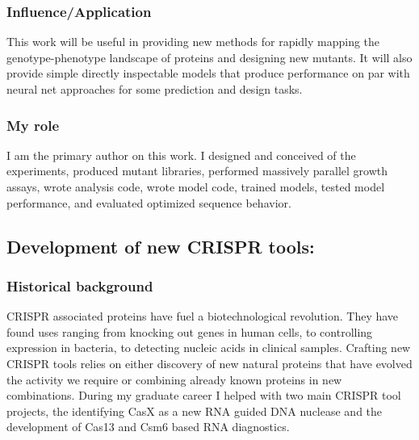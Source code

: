 \documentclass{article}
\begin{document}
\subsubsection{Influence/Application}
This work will be useful in providing new methods for rapidly mapping the genotype-phenotype landscape of proteins and designing new mutants.
It will also provide simple directly inspectable models that produce performance on par with neural net approaches for some prediction and design tasks.
%
\subsubsection{My role}
I am the primary author on this work.
I designed and conceived of the experiments, produced mutant libraries, performed massively parallel growth assays, wrote analysis code, wrote model code, trained models, tested model performance, and evaluated optimized sequence behavior.
%

\leavevmode\newline

\newrefsection
\subsection{Development of new CRISPR tools:}
\subsubsection{Historical background}
CRISPR associated proteins have fuel a biotechnological revolution.
They have found uses ranging from knocking out genes in human cells, to controlling expression in bacteria, to detecting nucleic acids in clinical samples.
Crafting new CRISPR tools relies on either discovery of new natural proteins that have evolved the activity we require or combining already known proteins in new combinations.
During my graduate career I helped with two main CRISPR tool projects, the identifying CasX as a new RNA guided DNA nuclease and the development of Cas13 and Csm6 based RNA diagnostics.
%
\end{document}
